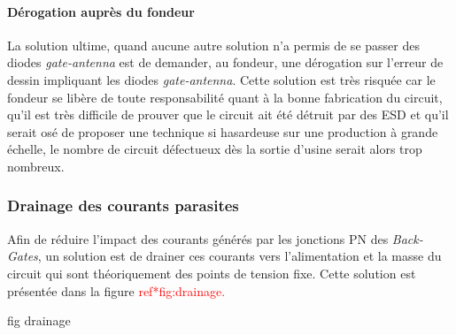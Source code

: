 \paragraph{Dérogation auprès du fondeur}
La solution ultime, quand aucune autre solution n’a permis de se passer des diodes \textit{gate-antenna} est de demander, au fondeur, une dérogation sur l’erreur de dessin impliquant les diodes \textit{gate-antenna}. Cette solution est très risquée car le fondeur se libère de toute responsabilité quant à la bonne fabrication du circuit, qu’il est très difficile de prouver que le circuit ait été détruit par des ESD et qu’il serait osé de proposer une technique si hasardeuse sur une production à grande échelle, le nombre de circuit défectueux dès la sortie d’usine serait alors trop nombreux.

\subsubsection{Drainage des courants parasites}
\label{sec:drainage}

Afin de réduire l'impact des courants générés par les jonctions PN des \textit{Back-Gates}, un solution est de drainer ces courants vers l'alimentation et la masse du circuit qui sont théoriquement des points de tension fixe. Cette solution est présentée dans la figure \textcolor{red}{ ref*{fig:drainage}.}

\begin{metsUneSource}
fig drainage
\end{metsUneSource}